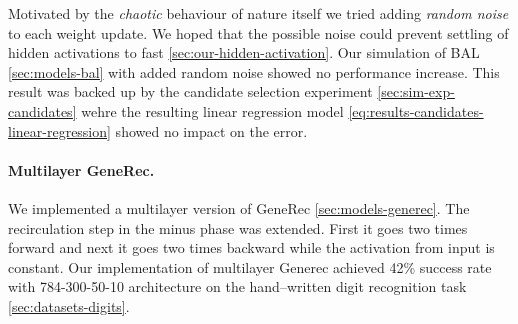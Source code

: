 Motivated by the \emph{chaotic} behaviour of nature itself we tried adding \emph{random noise} to each weight update. We hoped that the possible noise could prevent settling of hidden activations to fast \ref{sec:our-hidden-activation}. Our simulation of BAL \ref{sec:models-bal} with added random noise showed no performance increase. This result was backed up by the candidate selection experiment \ref{sec:sim-exp-candidates} wehre the resulting linear regression model \ref{eq:results-candidates-linear-regression} showed no impact on the error. 

\paragraph{Multilayer GeneRec.}

We implemented a multilayer version of GeneRec \ref{sec:models-generec}. The recirculation step in the minus phase was extended. First it goes two times forward and next it goes two times backward while the activation from input is constant. Our implementation of multilayer Generec achieved 42\% success rate with 784-300-50-10 architecture on the hand--written digit recognition task \ref{sec:datasets-digits}. 
